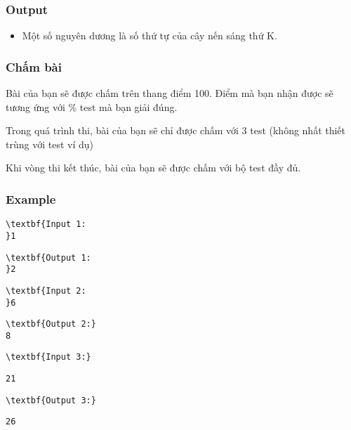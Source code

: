 \subsubsection{Output}
\begin{itemize}
	\item Một số nguyên dương là số thứ tự của cây nến sáng thứ K.
\end{itemize}

\subsubsection{Chấm bài}

Bài của bạn sẽ được chấm trên thang điểm 100. Điểm mà bạn nhận được sẽ tương ứng với \% test mà bạn giải đúng.

Trong quá trình thi, bài của bạn sẽ chỉ được chấm với 3 test (không nhất thiết trùng với test ví dụ)

Khi vòng thi kết thúc, bài của bạn sẽ được chấm với bộ test đầy đủ.

\subsubsection{Example}
\begin{verbatim}
\textbf{Input 1:
}1\end{verbatim}
\begin{verbatim}
\textbf{Output 1:
}2
\end{verbatim}
\begin{verbatim}
\textbf{Input 2:
}6 \end{verbatim}
\begin{verbatim}
\textbf{Output 2:}
8
\end{verbatim}
\begin{verbatim}
\textbf{Input 3:}\end{verbatim}
\begin{verbatim}
21 \end{verbatim}
\begin{verbatim}
\textbf{Output 3:}\end{verbatim}
\begin{verbatim}
26
\end{verbatim}
